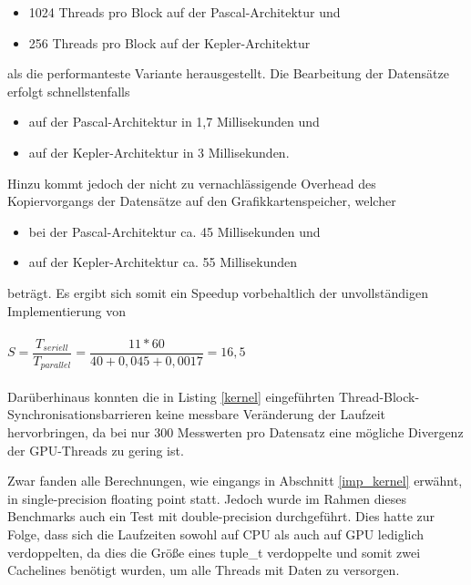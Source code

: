 \begin{itemize}
\item 1024 Threads pro Block auf der Pascal-Architektur und
\item 256 Threads pro Block auf der Kepler-Architektur
\end{itemize}
als die performanteste Variante herausgestellt. Die Bearbeitung der Datensätze erfolgt schnellstenfalls 
\begin{itemize}
\item auf der Pascal-Architektur in 1,7 Millisekunden und
\item auf der Kepler-Architektur in 3 Millisekunden.
\end{itemize}
Hinzu kommt jedoch der nicht zu vernachlässigende Overhead des Kopiervorgangs der Datensätze auf den Grafikkartenspeicher, welcher 
\begin{itemize}
\item bei der Pascal-Architektur ca. 45 Millisekunden und
\item auf der Kepler-Architektur ca. 55 Millisekunden
\end{itemize}
beträgt. Es ergibt sich somit ein Speedup vorbehaltlich der unvollständigen Implementierung von
\\\\
$S = \dfrac{T_{seriell}}{T_{parallel}} = \dfrac{11*60}{40+0,045+0,0017} = 16,5$
\\\\
Darüberhinaus konnten die in Listing \ref{kernel} eingeführten Thread-Block-Synchronisations\-barrieren keine messbare Veränderung der Laufzeit hervorbringen, da bei nur 300 Messwerten pro Datensatz eine mögliche Divergenz der GPU-Threads zu gering ist.

Zwar fanden alle Berechnungen, wie eingangs in Abschnitt \ref{imp_kernel} erwähnt, in single-precision floating point statt. Jedoch wurde im Rahmen dieses Benchmarks auch ein Test mit double-precision durchgeführt. Dies hatte zur Folge, dass sich die Laufzeiten sowohl auf CPU als auch auf GPU lediglich verdoppelten, da dies die Größe eines tuple\_t verdoppelte und somit zwei Cachelines benötigt wurden, um alle Threads mit Daten zu versorgen.



